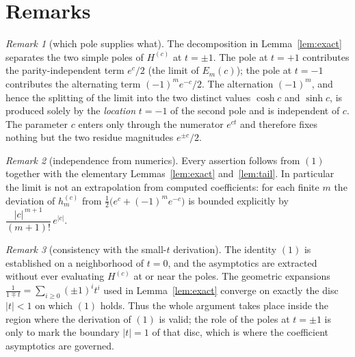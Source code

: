 \documentclass[11pt, fleqn]{amsart}
\theoremstyle{remark}
\newtheorem{remark}{Remark}
\begin{document}
\section{Remarks}

\begin{remark}[which pole supplies what]
The decomposition in Lemma~\ref{lem:exact} separates the two simple poles of
$H^{(c)}$ at $t=\pm1$. The pole at $t=+1$ contributes the parity-independent term
$e^{c}/2$ (the limit of $E_m(c)$); the pole at $t=-1$ contributes the alternating
term $(-1)^m e^{-c}/2$. The alternation $(-1)^m$, and hence the splitting of the
limit into the two distinct values $\cosh c$ and $\sinh c$, is produced solely by
the \emph{location} $t=-1$ of the second pole and is independent of $c$. The
parameter $c$ enters only through the numerator $e^{ct}$ and therefore fixes
nothing but the two residue magnitudes $e^{\pm c}/2$.
\end{remark}

\begin{remark}[independence from numerics]
Every assertion follows from $(1)$ together with the elementary
Lemmas~\ref{lem:exact} and~\ref{lem:tail}. In particular the limit is not an
extrapolation from computed coefficients: for each finite $m$ the deviation of
$h^{(c)}_m$ from $\tfrac12\bigl(e^{c}+(-1)^m e^{-c}\bigr)$ is bounded explicitly by
$\dfrac{|c|^{\,m+1}}{(m+1)!}\,e^{|c|}$.
\end{remark}

\begin{remark}[consistency with the small-$t$ derivation]
The identity $(1)$ is established on a neighborhood of $t=0$, and the asymptotics
are extracted without ever evaluating $H^{(c)}$ at or near the poles. The geometric
expansions $\frac{1}{1\mp t}=\sum_{i\ge0}(\pm1)^i t^i$ used in
Lemma~\ref{lem:exact} converge on exactly the disc $|t|<1$ on which $(1)$ holds.
Thus the whole argument takes place inside the region where the derivation of
$(1)$ is valid; the role of the poles at $t=\pm1$ is only to mark the boundary
$|t|=1$ of that disc, which is where the coefficient asymptotics are governed.
\end{remark}
\end{document}
